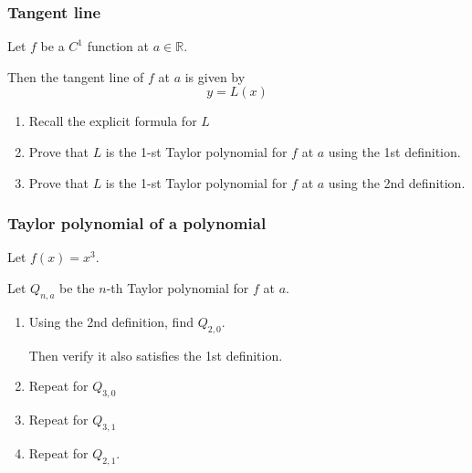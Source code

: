 \documentclass[14pt]{beamer}
\begin{document}
\begin{frame}[t]
	\frametitle{Tangent line}

	Let $f$ be a $C^{1}$ function at $a \in \mathbb{R}$.

	Then the tangent line of $f$ at $a$ is given by
	\[
		y = L(x)
	\]
	\begin{enumerate}
		\item Recall the explicit formula for $L$

		\item Prove that $L$ is the 1-st Taylor polynomial for $f$ at $a$ using the 1st
			definition.

		\item Prove that $L$ is the 1-st Taylor polynomial for $f$ at $a$ using the 2nd
			definition.
	\end{enumerate}
\end{frame}

\begin{frame}[t]
	\frametitle{Taylor polynomial of a polynomial}

	Let $f(x) = x^{3}$.

	Let $Q_{n,a}$ be the $n$-th Taylor polynomial for $f$ at $a$.
	\vspace{.2cm}

	\begin{enumerate}
		\item Using the 2nd definition, find $Q_{2,0}$.

			Then verify it also satisfies the 1st definition.
			\vspace{.2cm}

		\item Repeat for $Q_{3,0}$
			\vspace{.2cm}

		\item Repeat for $Q_{3,1}$
			\vspace{.2cm}

		\item Repeat for $Q_{2,1}$.
	\end{enumerate}
\end{frame}
\end{document}
